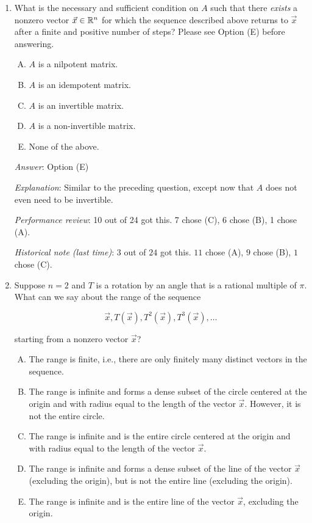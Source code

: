 \documentclass[10pt]{amsart}
\begin{document}
\begin{enumerate}
\item What is the necessary and sufficient condition on $A$ such that
  there {\em exists} a nonzero vector $\vec{x} \in \mathbb{R}^n$ for which the
  sequence described above returns to $\vec{x}$ after a finite and
  positive number of steps? Please see Option (E) before answering.

  \begin{enumerate}[(A)]
  \item $A$ is a nilpotent matrix.
  \item $A$ is an idempotent matrix.
  \item $A$ is an invertible matrix.
  \item $A$ is a non-invertible matrix.
  \item None of the above.
  \end{enumerate}

  {\em Answer}: Option (E)

  {\em Explanation}: Similar to the preceding question, except now
  that $A$ does not even need to be invertible.

  {\em Performance review}: 10 out of 24 got this. 7 chose (C), 6
  chose (B), 1 chose (A).

  {\em Historical note (last time)}: $3$ out of $24$ got this. $11$ chose (A),
  $9$ chose (B), $1$ chose (C).

\item Suppose $n = 2$ and $T$ is a rotation by an angle that is a
  rational multiple of $\pi$. What can we say about the range of
  the sequence

  $$\vec{x}, T(\vec{x}), T^2(\vec{x}), T^3(\vec{x}), \dots$$

  starting from a nonzero vector $\vec{x}$?

  \begin{enumerate}[(A)]
  \item The range is finite, i.e., there are only finitely many
    distinct vectors in the sequence.
  \item The range is infinite and forms a dense subset of the circle
    centered at the origin and with radius equal to the length of the
    vector $\vec{x}$. However, it is not the entire circle.
  \item The range is infinite and is the entire circle centered at the
    origin and with radius equal to the length of the vector
    $\vec{x}$.
  \item The range is infinite and forms a dense subset of the line of
    the vector $\vec{x}$ (excluding the origin), but is not the entire
    line (excluding the origin).
  \item The range is infinite and is the entire line of the vector
    $\vec{x}$, excluding the origin.
  \end{enumerate}


\end{enumerate}
\end{document}
